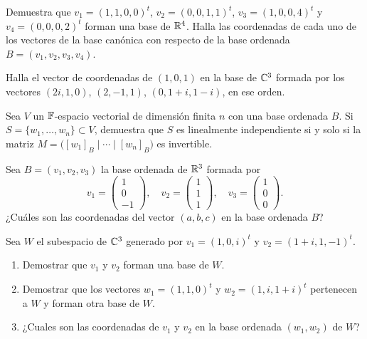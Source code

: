 \ExerciseSection

\begin{exerciselist}
  \item Demuestra que $v_1 = (1, 1, 0, 0)^t$, $v_2 = (0, 0, 1, 1)^t$, $v_3 = (1, 0, 0, 4)^t$ y $v_4 = (0, 0, 0, 2)^t$ forman una base de $\mathbb{R}^4$. Halla las coordenadas de cada uno de los vectores de la base canónica con respecto de la base ordenada $B = (v_1, v_2, v_3, v_4)$.
  
  \item Halla el vector de coordenadas de $(1, 0, 1)$ en la base de $\mathbb{C}^3$ formada por los vectores $(2i, 1, 0)$, $(2, -1, 1)$, $(0, 1+i, 1-i)$, en ese orden.
  
  \item Sea $V$ un $\mathbb{F}$-espacio vectorial de dimensión finita $n$ con una base ordenada $B$. Si $S = \{w_1, \ldots, w_n\} \subset V$, demuestra que $S$ es linealmente independiente si y solo si la matriz $M = \bigl( [w_1]_B \mid \cdots \mid [w_n]_B\bigr)$ es invertible.
  
  \item Sea $B = (v_1, v_2, v_3)$ la base ordenada de $\mathbb{R}^3$ formada por
    \[ 
      v_1 = \begin{pmatrix} 1 \\ 0 \\ -1 \end{pmatrix}, \quad
      v_2 = \begin{pmatrix} 1 \\ 1 \\ 1 \end{pmatrix}, \quad
      v_3 = \begin{pmatrix} 1 \\ 0 \\ 0 \end{pmatrix}.
    \]
    ¿Cuáles son las coordenadas del vector $(a,b,c)$ en la base ordenada $B$?

  \item Sea $W$ el subespacio de $\mathbb{C}^3$ generado por $v_1 = (1, 0, i)^t$ y $v_2 = (1+i, 1, -1)^t$.
    \begin{enumerate}
      \item Demostrar que $v_1$ y $v_2$ forman una base de $W$.
      \item Demostrar que los vectores $w_1 = (1, 1, 0)^t$ y $w_2 = (1, i, 1+i)^t$ pertenecen a $W$ y forman otra base de $W$.
      \item ¿Cuales son las coordenadas de $v_1$ y $v_2$ en la base ordenada $(w_1, w_2)$ de $W$?
    \end{enumerate}
  

\end{exerciselist}
